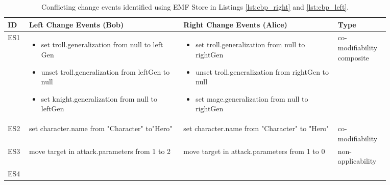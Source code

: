 \begin{table*}[ht]
  \centering
  \caption{Conflicting change events identified using EMF Store in Listings \ref{lst:cbp_right} and \ref{lst:cbp_left}.}
  \label{table:conflicts_emfs}
  \begin{scriptsize}
    \begin{tabular}{|p{0.04\linewidth}|p{0.36\linewidth}|p{0.36\linewidth}|
        p{0.11\linewidth}|}
      \hline
      \textbf{ID} & 
      \textbf{Left Change Events (Bob)} & 
      \textbf{Right Change Events (Alice)} & 
      \textbf{Type}\\ 
      \hline
      ES1 & 
      \begin{minipage}[t]{\linewidth}
        \raggedright
        \begin{itemize}[leftmargin=0pt]
          \setlength
          \item[] set troll.generalization from null to left
          Gen
          \item[] unset troll.generalization from leftGen
          to null
          \item[] set knight.generalization from null
          to leftGen
        \end{itemize}
      \end{minipage} & 
      \begin{minipage}[t]{\linewidth}
        \raggedright
        \begin{itemize}[leftmargin=0pt]
          \setlength
          \item[] set troll.generalization from null to
          rightGen
          \item[] unset troll.generalization from rightGen
          to null
          \item[] set mage.generalization from null to
          rightGen
        \end{itemize}
      \end{minipage} & 
      co-modifiability
      composite \\
      \hline
      ES2 & set character.name from "Character"
      to"Hero" & 
      set character.name from "Character"
      to "Hero" & 
      co-modifiability \\ 
      \hline
      ES3 & 
      move target in attack.parameters from
      1 to 2
      & 
      move target in attack.parameters from
      1 to 0
      & 
      non-applicability\\
      \hline
      ES4 & 
      \begin{minipage}[t]{\linewidth}

\end{minipage}
\end{tabular}
\end{scriptsize}
\end{table*}
